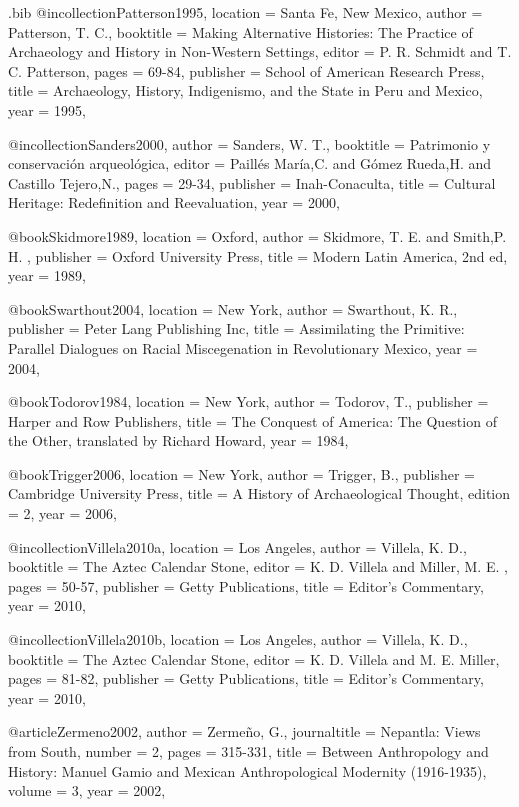 \begin{filecontents}{\IJSRAidentifier.bib}
@incollection{Patterson1995,
location =  {Santa Fe, New Mexico},
author = {Patterson, T. C.},
booktitle = {Making Alternative Histories: The Practice of Archaeology and History in Non-Western Settings},
editor = {P. R. Schmidt and T. C. Patterson},
pages = {69-84},
publisher = {School of American Research Press},
title = {Archaeology, History, Indigenismo, and the State in Peru and Mexico},
year = {1995},
}


@incollection{Sanders2000,
author = {Sanders, W. T.},
booktitle = {Patrimonio y conservación arqueológica},
editor = { Paillés María,C. and Gómez Rueda,H.  and  Castillo Tejero,N.},
pages = {29-34},
publisher = {Inah-Conaculta},
title = {Cultural Heritage: Redefinition and Reevaluation},
year = {2000},
}


@book{Skidmore1989,
location =  {Oxford},
author = {Skidmore, T. E. and Smith,P. H. },
publisher = {Oxford University Press},
title = {Modern Latin America, 2nd ed},
year = {1989},
}


@book{Swarthout2004,
location =  {New York},
author = {Swarthout, K. R.},
publisher = {Peter Lang Publishing Inc},
title = {Assimilating the Primitive: Parallel Dialogues on Racial Miscegenation in Revolutionary Mexico},
year = {2004},
}


@book{Todorov1984,
location =  {New York},
author = {Todorov, T.},
publisher = {Harper and Row Publishers},
title = {The Conquest of America: The Question of the Other, translated by Richard Howard},
year = {1984},
}


@book{Trigger2006,
location =  {New York},
author = {Trigger, B.},
publisher = {Cambridge University Press},
title = {A History of Archaeological Thought},
edition = {2},
year = {2006},
}


@incollection{Villela2010a,
location =  {Los Angeles},
author = {Villela, K. D.},
booktitle = {The Aztec Calendar Stone},
editor = {K. D. Villela and Miller, M. E. },
pages = {50-57},
publisher = {Getty Publications},
title = {Editor's Commentary},
year = {2010},
}


@incollection{Villela2010b,
location =  {Los Angeles},
author = {Villela, K. D.},
booktitle = {The Aztec Calendar Stone},
editor = {K. D. Villela and M. E. Miller},
pages = {81-82},
publisher = {Getty Publications},
title = {Editor's Commentary},
year = {2010},
}


@article{Zermeno2002,
author = {Zermeño, G.},
journaltitle =  {Nepantla: Views from South},
number = {2},
pages = {315-331},
title = {Between Anthropology and History: Manuel Gamio and Mexican Anthropological Modernity (1916-1935)},
volume = {3},
year = {2002},
}
\end{filecontents}

